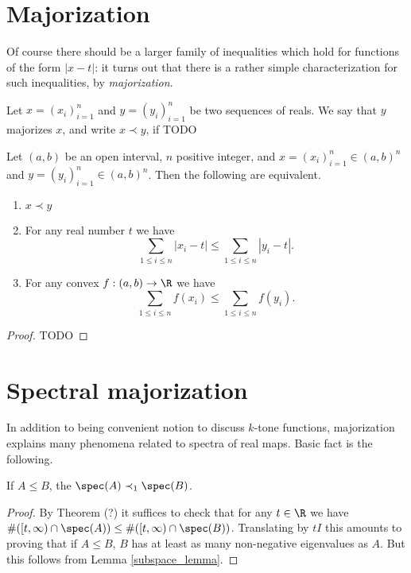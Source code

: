 \section{Majorization}

Of course there should be a larger family of inequalities which hold for functions of the form $|x - t|$: it turns out that there is a rather simple characterization for such inequalities, by \textit{majorization}.

\begin{maar}
	Let $x = (x_{i})_{i = 1}^{n}$ and $y = (y_{i})_{i = 1}^{n}$ be two sequences of reals. We say that $y$ majorizes $x$, and write $x \prec y$, if TODO
\end{maar}

\begin{lause}
	Let $(a, b)$ be an open interval, $n$ positive integer, and $x = (x_{i})_{i = 1}^{n} \in (a, b)^{n}$ and $y = (y_{i})_{i = 1}^{n} \in (a, b)^{n}$. Then the following are equivalent.
	\begin{enumerate}
		\item $x \prec y$
		\item For any real number $t$ we have
		\[
			\sum_{1 \leq i \leq n} |x_{i} - t| \leq \sum_{1 \leq i \leq n} |y_{i} - t|.
		\]
		\item For any convex $f : (a, b) \to \R$ we have
		\[
			\sum_{1 \leq i \leq n} f(x_{i}) \leq \sum_{1 \leq i \leq n} f(y_{i}).
		\]
	\end{enumerate}
\end{lause}
\begin{proof}
	TODO
\end{proof}

\section{Spectral majorization}

In addition to being convenient notion to discuss $k$-tone functions, majorization explains many phenomena related to spectra of real maps. Basic fact is the following.

\begin{prop}
	If $A \leq B$, the $\spec(A) \prec_{1} \spec(B)$.
\end{prop}
\begin{proof}
	By Theorem (?) it suffices to check that for any $t \in \R$ we have $\#([t, \infty) \cap \spec(A)) \leq \#([t, \infty) \cap \spec(B))$. Translating by $t I$ this amounts to proving that if $A \leq B$, $B$ has at least as many non-negative eigenvalues as $A$. But this follows from Lemma \ref{subspace_lemma}.
\end{proof}

